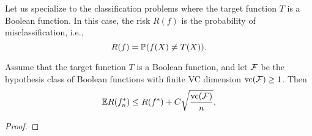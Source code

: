Let us specialize to the classification problems where the target function \(T\) is a Boolean function. In this case, the risk \(R(f)\) is the probability of misclassification, i.e.,
\begin{equation*}
	R(f)=\mathbb{P}(f(X)\neq T(X)).
\end{equation*}

\begin{theorem}
	Assume that the target function \(T\) is a Boolean function, and let \(\mathcal{F}\) be the hypothesis class of Boolean functions with finite VC dimension \(\text{vc}(\mathcal{F})\geq 1\). Then
	\begin{equation*}
		\mathbb{E} R(f_{n}^{*})\leq R(f^{*})+C\sqrt{\frac{\text{vc}(\mathcal{F})}{n}},
	\end{equation*}
\end{theorem}

\begin{proof}

\end{proof}
